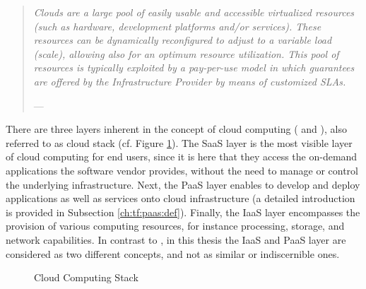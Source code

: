 \begin{quotation}{\slshape 
Clouds are a large pool of easily usable and accessible virtualized resources (such as hardware, development platforms and/or services). These resources can be dynamically reconfigured to adjust to a variable load (scale), allowing also for an optimum resource utilization. This pool of resources is typically exploited by a pay-per-use model in which guarantees are offered by the Infrastructure Provider by means of customized \acp{SLA}.}
\vspace*{-7pt}
\begin{flushright}
	--- \citealp[p. 51]{Vaquero2009}
\end{flushright}
\end{quotation}

There are three layers inherent in the concept of cloud computing (\citealp[pp. 118-119]{Iyer2010} and \citealp[pp. 2-3]{Mell2011}), also referred to as cloud stack (cf. Figure \ref{fig:ccs}). The \ac{SaaS} layer is the most visible layer of cloud computing for end users, since it is here that they access the on-demand applications the software vendor provides, without the need to manage or control the underlying infrastructure. Next, the \ac{PaaS} layer enables to develop and deploy applications as well as services onto cloud infrastructure (a detailed introduction is provided in Subsection \ref{ch:tf:paas:def}). Finally, the \ac{IaaS} layer encompasses the provision of various computing resources, for instance processing, storage, and network capabilities. In contrast to \citet[p. 50]{Armbrust2010}, in this thesis the \ac{IaaS} and \ac{PaaS} layer are considered as two different concepts, and not as similar or indiscernible ones. 

\begin{figure}[tb]
	\centering
	
	\caption{Cloud Computing Stack}
	\label{fig:ccs}
\end{figure}

